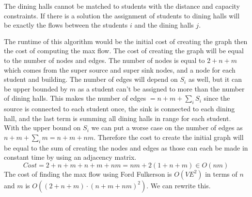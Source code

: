 \documentclass{article}
\begin{document}
The dining halls cannot be matched to students with the distance and capacity constraints.
If there is a solution the assignment of students to dining halls will be exactly the flows between the students $i$ and the dining halls $j$.
\newline
\newline
\begin{figure}[!h]
\centering
{}
\end{figure}
\newline
\newline
\indent The runtime of this algorithm would be the initial cost of creating the graph then the cost of computing the max flow.
The cost of creating the graph will be equal to the number of nodes and edges.
The number of nodes is equal to $2 + n + m$ which comes from the super source and super sink nodes, and a node for each student and building.
The number of edges will depend on $S_i$ as well, but it can be upper bounded by $m$ as a student can't be assigned to more than the number of dining halls.
This makes the number of edges $= n + m + \sum_{i}S_i$ since the source is connected to each student once, the sink is connected to each dining hall, and the last term is summing all dining halls in range for each student.
With the upper bound on $S_i$ we can put a worse case on the number of edges as $n + m + \sum_{i}m = n + m + nm$.
Therefore the cost to create the initial graph will be equal to the sum of creating the nodes and edges as those can each be made in constant time by using an adjacency matrix.
$$ Cost = 2 + n + m + n + m + nm = nm + 2(1 + n + m) \in O(nm) $$
The cost of finding the max flow using Ford Fulkerson is $O(VE^2)$ in terms of $n$ and $m$ is $O((2+n+m)\cdot(n + m + nm)^2)$.
We can rewrite this.
\end{document}
